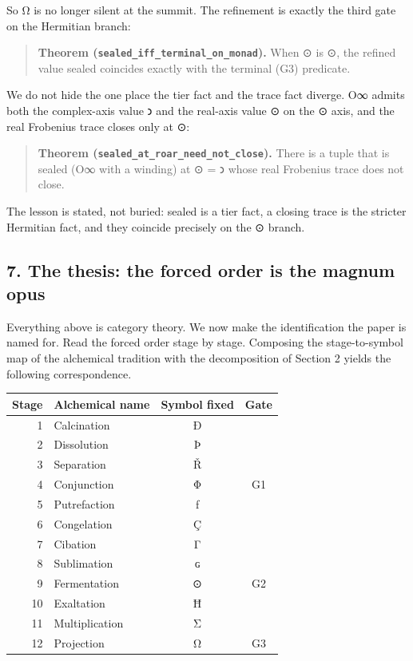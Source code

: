 So Ω is no longer silent at the summit. The refinement is exactly the
third gate on the Hermitian branch:

\begin{quote}
\textbf{Theorem (\texttt{sealed\_iff\_terminal\_on\_monad}).} When ⊙ is
⊙, the refined value sealed coincides exactly with the terminal (G3)
predicate.
\end{quote}

We do not hide the one place the tier fact and the trace fact diverge.
O∞ admits both the complex-axis value 𐑮 and the real-axis value ⊙ on the
⊙ axis, and the real Frobenius trace closes only at ⊙:

\begin{quote}
\textbf{Theorem (\texttt{sealed\_at\_roar\_need\_not\_close}).} There is
a tuple that is sealed (O∞ with a winding) at ⊙ = 𐑮 whose real Frobenius
trace does not close.
\end{quote}

The lesson is stated, not buried: sealed is a tier fact, a closing trace
is the stricter Hermitian fact, and they coincide precisely on the ⊙
branch.

\hypertarget{the-thesis-the-forced-order-is-the-magnum-opus}{%
\subsection{7. The thesis: the forced order is the magnum
opus}\label{the-thesis-the-forced-order-is-the-magnum-opus}}

Everything above is category theory. We now make the identification the
paper is named for. Read the forced order stage by stage. Composing the
stage-to-symbol map of the alchemical tradition with the decomposition
of Section 2 yields the following correspondence.

\begin{longtable}[]{@{}rlcc@{}}
\toprule
Stage & Alchemical name & Symbol fixed & Gate\tabularnewline
\midrule
\endhead
1 & Calcination & Ð &\tabularnewline
2 & Dissolution & Þ &\tabularnewline
3 & Separation & Ř &\tabularnewline
4 & Conjunction & Φ & G1\tabularnewline
5 & Putrefaction & ƒ &\tabularnewline
6 & Congelation & Ç &\tabularnewline
7 & Cibation & Γ &\tabularnewline
8 & Sublimation & ɢ &\tabularnewline
9 & Fermentation & ⊙ & G2\tabularnewline
10 & Exaltation & Ħ &\tabularnewline
11 & Multiplication & Σ &\tabularnewline
12 & Projection & Ω & G3\tabularnewline
\bottomrule
\end{longtable}

